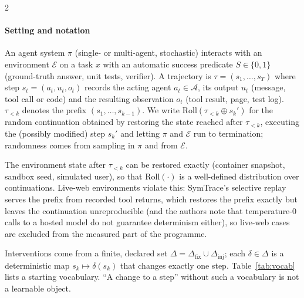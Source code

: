 \begin{multicols}{2}
\paragraph{Setting and notation} An agent system $\pi$ (single- or multi-agent, stochastic) interacts with an environment $\mathcal{E}$ on a task $x$ with an automatic success predicate $S\in\{0,1\}$ (ground-truth answer, unit tests, verifier). A trajectory is $\tau=(s_1,\dots,s_T)$ where step $s_t=(a_t,u_t,o_t)$ records the acting agent $a_t\in\mathcal{A}$, its output $u_t$ (message, tool call or code) and the resulting observation $o_t$ (tool result, page, test log). $\tau_{<k}$ denotes the prefix $(s_1,\dots,s_{k-1})$. We write $\mathrm{Roll}(\tau_{<k}\oplus s_k')$ for the random continuation obtained by restoring the state reached after $\tau_{<k}$, executing the (possibly modified) step $s_k'$ and letting $\pi$ and $\mathcal{E}$ run to termination; randomness comes from sampling in $\pi$ and from $\mathcal{E}$.

\begin{assumption}[Replayability]\label{as:replay}
The environment state after $\tau_{<k}$ can be restored exactly (container snapshot, sandbox seed, simulated user), so that $\mathrm{Roll}(\cdot)$ is a well-defined distribution over continuations. Live-web environments violate this: SymTrace's selective replay \cite{luan2026symtrace} serves the prefix from recorded tool returns, which restores the prefix exactly but leaves the continuation unreproducible (and the authors note that temperature-0 calls to a hosted model do not guarantee determinism either), so live-web cases are excluded from the measured part of the programme.
\end{assumption}

\begin{assumption}\label{as:vocab}
Interventions come from a finite, declared set $\Delta=\Delta_{\mathrm{fix}}\cup\Delta_{\mathrm{inj}}$; each $\delta\in\Delta$ is a deterministic map $s_k\mapsto\delta(s_k)$ that changes exactly one step. Table~\ref{tab:vocab} lists a starting vocabulary. ``A change to a step'' without such a vocabulary is not a learnable object.
\end{assumption}


\end{multicols}
